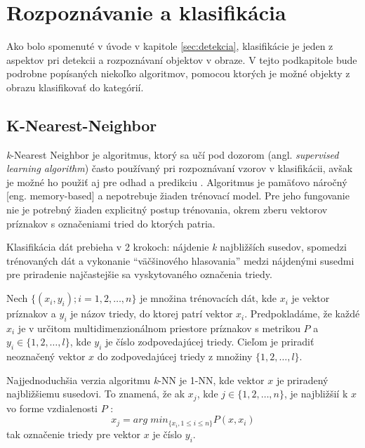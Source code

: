 
\section{Rozpoznávanie a klasifikácia}
\label{sec:klasifikacia}

Ako bolo spomenuté v úvode v kapitole \ref{sec:detekcia}, klasifikácie je jeden z aspektov pri detekcii a rozpoznávaní objektov v obraze.
V tejto podkapitole bude podrobne popísaných niekoľko algoritmov, pomocou ktorých je možné objekty z obrazu klasifikovať do kategórií.



\subsection{K-Nearest-Neighbor}
\textit{k}-Nearest Neighbor je algoritmus, ktorý sa učí pod dozorom (angl. \textit{supervised learning algorithm}) často používaný pri rozpoznávaní vzorov v klasifikácii,
avšak je možné ho použiť aj pre odhad a predikciu \cite{book:DataMining}.
Algoritmus je pamäťovo náročný [eng. memory-based] a nepotrebuje žiaden trénovací model.
Pre jeho fungovanie nie je potrebný žiaden explicitný postup trénovania, okrem zberu vektorov príznakov s označeniami tried do ktorých patria.

Klasifikácia dát prebieha v 2 krokoch: nájdenie \textit{k} najbližších susedov, spomedzi trénovaných dát a
vykonanie ``väčšinového hlasovania'' medzi nájdenými susedmi pre priradenie najčastejšie sa vyskytovaného označenia triedy.

Nech $\{ (x_i, y_i); i = 1, 2, \dots, n \}$ je množina trénovacích dát, kde $x_i$ je vektor príznakov a $y_i$ je názov triedy, do ktorej patrí vektor $x_i$.
Predpokladáme, že každé $x_i$ je v určitom multidimenzionálnom priestore príznakov s metrikou $P$ a $y_i \in \{ 1, 2, \dots, l \}$, kde $y_i$ je číslo zodpovedajúcej triedy.
Cieľom je priradiť neoznačený vektor $x$ do zodpovedajúcej triedy z množiny $\{ 1, 2, \dots, l \}$.

Najjednoduchšia verzia algoritmu \textit{k}-NN je 1-NN, kde vektor $x$ je priradený najbližšiemu susedovi.
To znamená, že ak $x_j$, kde $j \in \{ 1, 2, \dots, n \}$, je najbližšií k $x$ vo forme vzdialenosti $P$ \cite{prop:KnnClassification}:
\begin{equation}
    \label{eq:kNNMetric}
    x_j = arg \; min_{\{x_i, 1 \leq i \leq n\}} P(x, x_i)
\end{equation}
tak označenie triedy pre vektor $x$ je číslo $y_i$.

